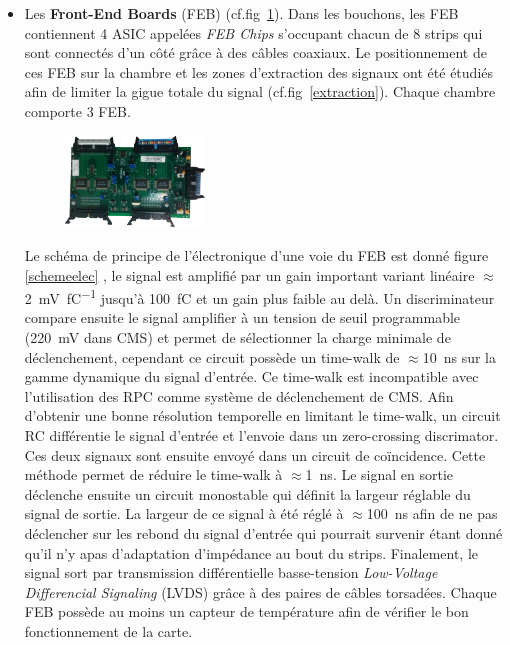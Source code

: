 \begin{itemize}[label=$\bullet$]
	\item Les \textbf{Front-End Boards} (FEB) (cf.fig~\ref{Feb}). Dans les bouchons, les FEB contiennent \num{4} ASIC appelées \textit{FEB Chips} s'occupant chacun de \num{8} strips qui sont connectés d'un côté grâce à des câbles coaxiaux. Le positionnement de ces FEB sur la chambre et les zones d'extraction des signaux ont été étudiés afin de limiter la gigue totale du signal (cf.fig~\ref{extraction}). Chaque chambre comporte \num{3} FEB.
	
	\begin{figure}[ht!]
		\centering
		\includegraphics[width=0.35\textwidth]{RPC/Feb.png}
		\label{Feb}
	\end{figure}

	Le schéma de principe de l'électronique d'une voie du FEB est donné figure \ref{schemeelec} \cite{electro}, le signal est amplifié par un gain important variant linéaire $\approx$\SI{2}{\milli\volt\per\femto\coulomb} jusqu'à \SI{100}{\femto\coulomb} et un gain plus faible au delà. Un discriminateur compare ensuite le signal amplifier à un tension de seuil programmable (\SI{220}{\milli\volt} dans CMS) et permet de sélectionner la charge minimale de déclenchement, cependant ce circuit possède un time-walk de $\approx$\SI{10}{\nano\second} sur la gamme dynamique du signal d'entrée. Ce time-walk est incompatible avec l'utilisation des RPC comme système de déclenchement de CMS. Afin d'obtenir une bonne résolution temporelle en limitant le time-walk, un circuit RC différentie le signal d'entrée et l'envoie dans un zero-crossing discrimator. Ces deux signaux sont ensuite envoyé dans un circuit de coïncidence. Cette méthode permet de réduire le time-walk à $\approx$\SI{1}{\nano\second}. Le signal en sortie déclenche ensuite un circuit monostable qui définit la largeur réglable du signal de sortie. La largeur de ce signal à été réglé à $\approx$\SI{100}{\nano\second} afin de ne pas déclencher sur les rebond du signal d'entrée qui pourrait survenir étant donné qu'il n'y apas d'adaptation d'impédance au bout du strips. Finalement, le signal sort par transmission différentielle basse-tension \textit{Low-Voltage Differencial Signaling} (LVDS) grâce à des paires de câbles torsadées. Chaque FEB possède au moins un capteur de température afin de vérifier le bon fonctionnement de la carte.
	

\end{itemize}
